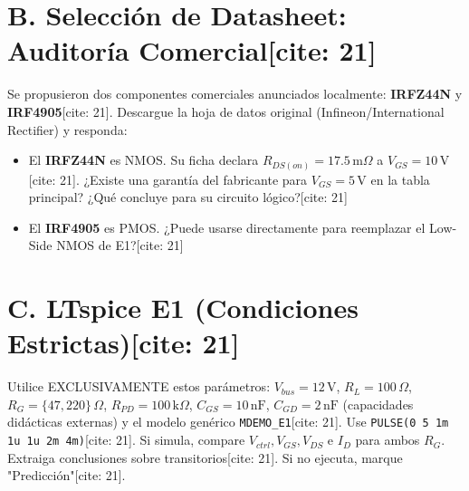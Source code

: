 \documentclass[11pt, a4paper]{article}
\begin{document}
\section*{B. Selección de Datasheet: Auditoría Comercial[cite: 21]}
Se propusieron dos componentes comerciales anunciados localmente: \textbf{IRFZ44N} y \textbf{IRF4905}[cite: 21].
Descargue la hoja de datos original (Infineon/International Rectifier) y responda:
\begin{itemize}
    \setlength\itemsep{0.1em}
    \item El \textbf{IRFZ44N} es NMOS. Su ficha declara $R_{DS(on)} = 17.5\,\text{m}\Omega$ a $V_{GS}=10\,\text{V}$[cite: 21]. ¿Existe una garantía del fabricante para $V_{GS}=5\,\text{V}$ en la tabla principal? ¿Qué concluye para su circuito lógico?[cite: 21] \hrulefill
    \item El \textbf{IRF4905} es PMOS. ¿Puede usarse directamente para reemplazar el Low-Side NMOS de E1?[cite: 21] \hrulefill
\end{itemize}

\section*{C. LTspice E1 (Condiciones Estrictas)[cite: 21]}
Utilice EXCLUSIVAMENTE estos parámetros: $V_{bus}=12\,\text{V}$, $R_L=100\,\Omega$, $R_G = \{47, 220\}\,\Omega$, $R_{PD}=100\,\text{k}\Omega$, $C_{GS}=10\,\text{nF}$, $C_{GD}=2\,\text{nF}$ (capacidades didácticas externas) y el modelo genérico \texttt{MDEMO\_E1}[cite: 21].
Use \texttt{PULSE(0 5 1m 1u 1u 2m 4m)}[cite: 21]. 
Si simula, compare $V_{ctrl}, V_{GS}, V_{DS}$ e $I_D$ para ambos $R_G$. Extraiga conclusiones sobre transitorios[cite: 21]. Si no ejecuta, marque "Predicción"[cite: 21].
\end{document}
